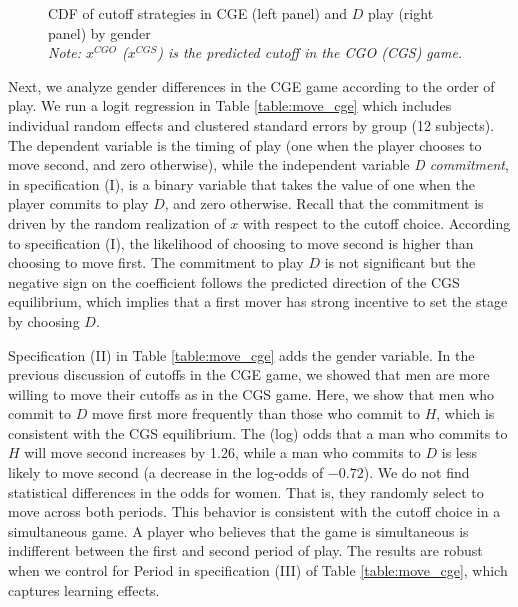 \documentclass[12pt, letterpaper]{article}
\theoremstyle{plain}
\begin{document}
\begin{center}
\begin{figure}[ht]
\centering{}%
\begin{minipage}[t]{0.45\columnwidth}%
%
\end{minipage}%
\begin{minipage}[t]{0.45\columnwidth}%
%
\end{minipage} 
\caption{CDF of cutoff strategies in CGE (left panel) and $D$ play (right panel) by gender\\ \footnotesize{\textit{Note: $x^{CGO}$ ($x^{CGS}$) is the predicted cutoff in the CGO (CGS) game.}}}
\label{fig:cdfgender2}\end{figure}
\par\end{center}


Next, we analyze gender differences in the CGE game according to the order of play. We run a logit regression in Table \ref{table:move_cge} which includes individual random effects and clustered standard errors by group (12 subjects). The dependent variable is the timing of play (one when the player chooses to move second, and zero otherwise), while the independent variable \textit{D commitment}, in specification (I), is a binary variable that takes the value of one when the player commits to play $D$, and zero otherwise. Recall that the commitment is driven by the random realization of $x$ with respect to the cutoff choice. According to specification (I), the likelihood of choosing to move second is higher than choosing to move first. The commitment to play $D$ is not significant but the negative sign on the coefficient follows the predicted direction of the CGS equilibrium, which implies that a first mover has strong incentive to set the stage by choosing $D$. 

Specification (II) in Table \ref{table:move_cge} adds the gender variable. In the previous discussion of cutoffs in the CGE game, we showed that men are more willing to move their cutoffs as in the CGS game. Here, we show that men who commit to $D$ move first more frequently than those who commit to $H$, which is consistent with the CGS equilibrium. The (log) odds that a man who commits to $H$ will move second increases by 1.26, while a man who commits to $D$ is less likely to move second (a decrease in the log-odds of  $-0.72$). We do not find statistical differences in the odds for women. That is, they randomly select to move across  both periods. This behavior is consistent with the cutoff choice in a simultaneous game. A player who believes that the game is simultaneous is indifferent between the first and second period of play. The results are robust when we control for Period in specification (III) of Table \ref{table:move_cge}, which captures learning effects. 
\end{document}
